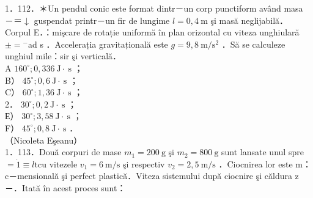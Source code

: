\documentclass[10pt]{article}
\begin{document}
1．112．＊Un pendul conic este format dintr－un corp punctiform având masa －＝$\downarrow$ guspendat printr－un fir de lungime $l=0,4 \mathrm{~m}$ şi masă neglijabilă．Corpul E．：mişcare de rotație uniformă în plan orizontal cu viteza unghiulară $\pm={ }^{-}$ad s ．Accelerația gravitațională este $g=9,8 \mathrm{~m} / \mathrm{s}^{2}$ ．Să se calculeze unghiul mile：sir şi verticală．\\
A $160^{\circ} ; 0,336 \mathrm{~J} \cdot \mathrm{~s}$ ；\\
B） $45^{\circ} ; 0,6 \mathrm{~J} \cdot \mathrm{~s}$ ；\\
C） $60^{\circ} ; 1,36 \mathrm{~J} \cdot \mathrm{~s}$ ；\\
2． $30^{\circ} ; 0,2 \mathrm{~J} \cdot \mathrm{~s}$ ；\\
Е） $30^{\circ} ; 3,58 \mathrm{~J} \cdot \mathrm{~s}$ ；\\
F） $45^{\circ} ; 0,8 \mathrm{~J} \cdot \mathrm{~s}$ ．\\
（Nicoleta Eşeanu）\\
1．113．Două corpuri de mase $m_{1}=200 \mathrm{~g}$ şi $m_{2}=800 \mathrm{~g}$ sunt lansate unul spre $=\dot{1} \equiv l \mathrm{t} \mathrm{cu}$ vitezele $v_{1}=6 \mathrm{~m} / \mathrm{s}$ şi respectiv $v_{2}=2,5 \mathrm{~m} / \mathrm{s}$ ．Ciocnirea lor este m：c－mensională şi perfect plastică．Viteza sistemului după ciocnire şi căldura z－．Itată în acest proces sunt：
\end{document}
